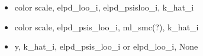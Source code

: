 \begin{itemize}
\begin{itemize}
    \begin{itemize}
    \tightlist
    \item
      color scale, elpd\_loo\_i, elpd\_psisloo\_i, k\_hat\_i
    \item
      color scale, elpd\_psis\_loo\_i, ml\_smc(?), k\_hat\_i
    \item
      y, k\_hat\_i, elpd\_psis\_loo\_i or elpd\_loo\_i, None
    \end{itemize}
  \end{itemize}
\end{itemize}
